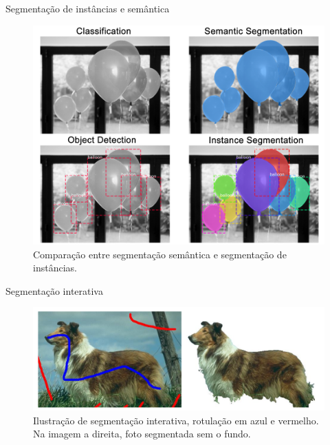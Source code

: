 \documentclass{templatebeamerufc/libs/ufc_format}
\begin{document}
\begin{frame}{Segmentação de instâncias e semântica}
  \begin{figure}\label{fig:semantic-vs-instance-segmentation}
    \centering
    \caption{Comparação entre segmentação semântica e segmentação de instâncias.}
    \includegraphics[scale=0.2]{figuras/image-segmentation-types}
  \end{figure}
\end{frame}

\begin{frame}{Segmentação interativa}
  \begin{figure}\label{fig:interactive--segmentation}
    \centering
    \caption{Ilustração de segmentação interativa, rotulação em azul e
      vermelho.\\ Na imagem a direita, foto segmentada sem o fundo.}
    \includegraphics[scale=0.6]{figuras/interactive-segmentation-2008}
  \end{figure}
\end{frame}
\end{document}
